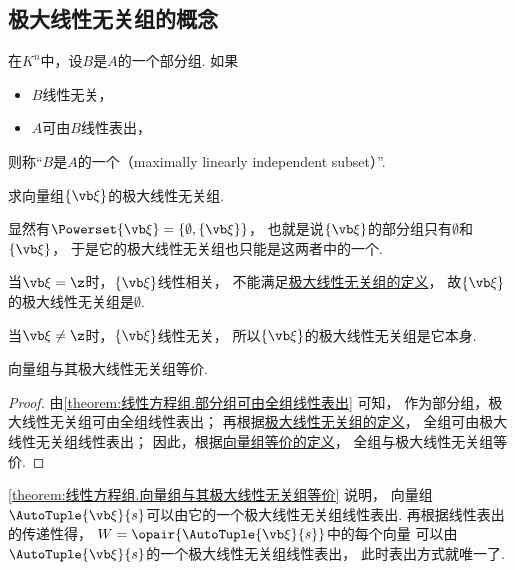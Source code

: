 \subsection{极大线性无关组的概念}
\begin{definition}\label{definition:线性方程组.极大线性无关组的定义}
在\(K^n\)中，设\(B\)是\(A\)的一个部分组.
如果\begin{itemize}
	\item \(B\)线性无关，
	\item \(A\)可由\(B\)线性表出，
\end{itemize}
则称“\(B\)是\(A\)的一个（maximally linearly independent subset）”.
\end{definition}

\begin{example}\label{example:向量空间.单向量组的极大线性无关组}
求向量组\(\{\a\}\)的极大线性无关组.
\begin{solution}
显然有\(\Powerset\{\a\} = \{ \emptyset, \{\a\} \}\)，
也就是说\(\{\a\}\)的部分组只有\(\emptyset\)和\(\{\a\}\)，
于是它的极大线性无关组也只能是这两者中的一个.

当\(\a=\z\)时，\(\{\a\}\)线性相关，
不能满足\hyperref[definition:线性方程组.极大线性无关组的定义]{极大线性无关组的定义}，
故\(\{\a\}\)的极大线性无关组是\(\emptyset\).

当\(\a\neq\z\)时，\(\{\a\}\)线性无关，
所以\(\{\a\}\)的极大线性无关组是它本身.
\end{solution}
\end{example}

\begin{theorem}\label{theorem:线性方程组.向量组与其极大线性无关组等价}
向量组与其极大线性无关组等价.
\begin{proof}
由\cref{theorem:线性方程组.部分组可由全组线性表出} 可知，
作为部分组，极大线性无关组可由全组线性表出；
再根据\hyperref[definition:线性方程组.极大线性无关组的定义]{极大线性无关组的定义}，
全组可由极大线性无关组线性表出；
因此，根据\hyperref[definition:向量空间.向量组等价的定义]{向量组等价的定义}，
全组与极大线性无关组等价.
\end{proof}
\end{theorem}
\cref{theorem:线性方程组.向量组与其极大线性无关组等价} 说明，
向量组\(\AutoTuple{\a}{s}\)可以由它的一个极大线性无关组线性表出.
再根据线性表出的传递性得，
\(W=\opair{\AutoTuple{\a}{s}}\)中的每个向量%
可以由\(\AutoTuple{\a}{s}\)的一个极大线性无关组线性表出，
此时表出方式就唯一了.

